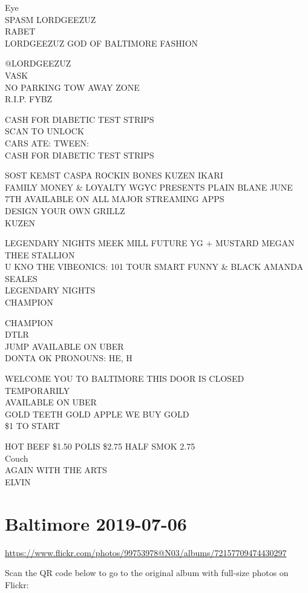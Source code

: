 \documentclass[10pt,letterpaper]{article}
\begin{document}
Eye\\
SPASM LORDGEEZUZ\\
RABET\\
LORDGEEZUZ GOD OF BALTIMORE FASHION

@LORDGEEZUZ\\
VASK\\
NO PARKING TOW AWAY ZONE\\
R.I.P. FYBZ

CASH FOR DIABETIC TEST STRIPS\\
SCAN TO UNLOCK\\
CARS ATE: TWEEN:\\
CASH FOR DIABETIC TEST STRIPS

SOST KEMST CASPA ROCKIN BONES KUZEN IKARI\\
FAMILY MONEY \& LOYALTY WGYC PRESENTS PLAIN BLANE JUNE 7TH AVAILABLE ON ALL MAJOR STREAMING APPS\\
DESIGN YOUR OWN GRILLZ\\
KUZEN

LEGENDARY NIGHTS MEEK MILL FUTURE YG + MUSTARD MEGAN THEE STALLION\\
U KNO THE VIBEONICS: 101 TOUR SMART FUNNY \& BLACK AMANDA SEALES\\
LEGENDARY NIGHTS\\
CHAMPION

CHAMPION\\
DTLR\\
JUMP AVAILABLE ON UBER\\
DONTA OK PRONOUNS: HE, H

WELCOME YOU TO BALTIMORE THIS DOOR IS CLOSED TEMPORARILY\\
AVAILABLE ON UBER\\
GOLD TEETH GOLD APPLE WE BUY GOLD\\
\$1 TO START

HOT BEEF \$1.50 POLIS \$2.75 HALF SMOK 2.75\\
Couch\\
AGAIN WITH THE ARTS\\
ELVIN


\section*{Baltimore 2019-07-06}

\url{https://www.flickr.com/photos/99753978@N03/albums/72157709474430297}

Scan the QR code below to go to the original album with full-size photos on Flickr:
\end{document}
